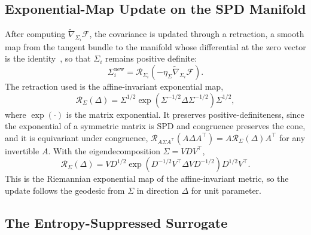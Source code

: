 \subsection*{Exponential-Map Update on the SPD Manifold}

After computing $\tilde{\nabla}_{\Sigma_i}\mathcal{F}$, the covariance is updated through a retraction, a smooth map from the tangent bundle to the manifold whose differential at the zero vector is the identity~\cite{Absil2008}, so that $\Sigma_i$ remains positive definite:
\begin{equation}
\Sigma_i^{\mathrm{new}} = \mathcal{R}_{\Sigma_i}(-\eta_\Sigma \tilde{\nabla}_{\Sigma_i}\mathcal{F}).
\end{equation}
The retraction used is the affine-invariant exponential map,
\begin{equation}
\mathcal{R}_{\Sigma}(\Delta) = \Sigma^{1/2} \exp\left(\Sigma^{-1/2} \Delta \Sigma^{-1/2}\right) \Sigma^{1/2},
\end{equation}
where $\exp(\cdot)$ is the matrix exponential. It preserves positive-definiteness, since the exponential of a symmetric matrix is SPD and congruence preserves the cone, and it is equivariant under congruence, $\mathcal{R}_{A\Sigma A^\top}(A\Delta A^\top) = A \mathcal{R}_{\Sigma}(\Delta) A^\top$ for any invertible $A$. With the eigendecomposition $\Sigma = V D V^\top$,
\begin{equation}
\mathcal{R}_{\Sigma}(\Delta) = V D^{1/2} \exp\left(D^{-1/2} V^\top \Delta V D^{-1/2}\right) D^{1/2} V^\top.
\end{equation}
This is the Riemannian exponential map of the affine-invariant metric, so the update follows the geodesic from $\Sigma$ in direction $\Delta$ for unit parameter.

\subsection*{The Entropy-Suppressed Surrogate}

